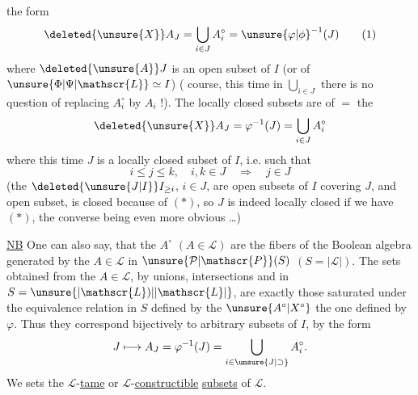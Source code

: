 the form
\[
 \deleted{\unsure{X}}A_J=\bigcup_{i\in J}A_i^\circ={\unsure{\varphi|\phi}}^{-1}(J)
 \tag*{(1)}
\]
where $\deleted{\unsure{A}}J$ is an open subset of $I$ (or of $\unsure{\Phi|\Psi|\mathscr{L}}\simeq I$) ( course, this time in $\displaystyle\bigcup_{i\in J}$ there is no question of replacing $A_i^\circ$ by $A_i$ !). The locally closed subsets are of \ensuremath{=} the
\[
 \deleted{\unsure{X}}A_J=\varphi^{-1}(J)=\bigcup_{i\in J}A_i^\circ
\]
where this time $J$ is a locally closed subset of $I$, i.e. such that
\[
 i\leq j\leq k,\quad i,k\in J\quad\Rightarrow\quad j\in J
 \tag*{$(*)$}
\]
(the $\deleted{\unsure{J|I}}I_{\geq i}$, $i\in J$, are open subsets of $I$ covering $J$, and  open subset,  is closed  because of $(*)$, so $J$ is indeed locally closed if we have $(*)$, the converse being even more obvious \ldots)

\uline{NB} One can also say,  that the $A^\circ$ $(A\in\mathscr{L})$ are the  fibers of the Boolean algebra generated by the $A\in\mathscr{L}$ in $\unsure{\mathcal{P}|\mathscr{P}}(S)$ $(S=|\mathscr{L}|)$. The sets obtained from the $A\in\mathscr{L}$, by unions, intersections and  in $S=\unsure{\lvert\mathscr{L})|\lvert\mathscr{L}\rvert}$, are exactly those saturated under the equivalence relation in $S$ defined by the $\unsure{A^\circ|X^\circ}$  the one defined by $\varphi$. Thus they correspond bijectively to arbitrary subsets of $I$, by the form
\[
 J\longmapsto A_J=\varphi^{-1}(J)=\bigcup_{i\in\unsure{J|\supset}}A_i^\circ .
\]
We   sets  the $\mathscr{L}$-\uline{tame} or $\mathscr{L}$-\uline{constructible} \uline{subsets} of $\mathscr{L}$.
